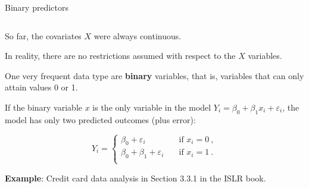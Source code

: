 \documentclass[10pt,ignorenonframetext,]{beamer}
\begin{document}
\begin{frame}

\begin{block}{Binary predictors}

\(~\)

So far, the covariates \(X\) were always continuous.\\
\vspace{2mm}

In reality, there are no restrictions assumed with respect to the \(X\)
variables. \vspace{2mm}

One very frequent data type are \textbf{binary} variables, that is,
variables that can only attain values 0 or 1. \vspace{4mm}

If the binary variable \(x\) is the only variable in the model
\(Y_i = \beta_0 + \beta_1 x_i + \varepsilon_i\), the model has only two
predicted outcomes (plus error):

\begin{equation*}
Y_i = \left\{ 
\begin{array}{ll}
 \beta_0  + \varepsilon_i \quad &\text{if } x_i=0 \ , \\
 \beta_0 + \beta_1 + \varepsilon_i \quad &\text{if } x_i =1 \ .\\
\end{array}
\right .
\end{equation*}

\vspace{4mm}

\textbf{Example}: Credit card data analysis in Section 3.3.1 in the ISLR
book.

\end{block}

\end{frame}
\end{document}
